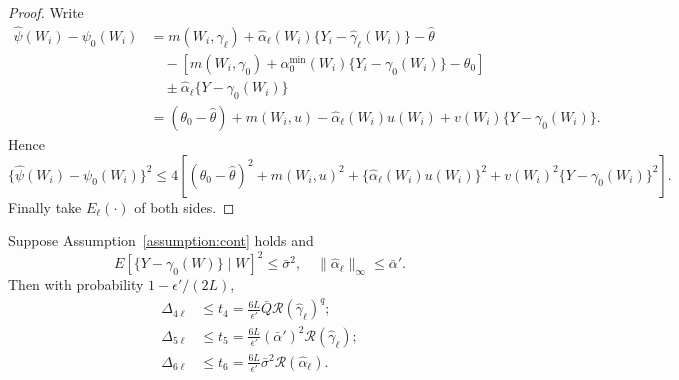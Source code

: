\begin{proof}
Write
\begin{align*}
    \hat{\psi}(W_i)-\psi_0(W_i)
    &=m(W_i,\hat{\gamma}_{\ell})+\hat{\alpha}_{\ell}(W_i)\{Y_i-\hat{\gamma}_{\ell}(W_i)\}-\hat{\theta}\\
    &\quad -\left[m(W_i,\gamma_0)+\alpha_0^{\min}(W_i)\{Y_i-\gamma_0(W_i)\}-\theta_0\right] \\
    &\quad\pm \hat{\alpha}_{\ell}\{Y-\gamma_0(W_i)\}\\
    &=(\theta_0-\hat{\theta})+m(W_i,u)-\hat{\alpha}_{\ell}(W_i)u(W_i)+v(W_i)\{Y-\gamma_0(W_i)\}.
\end{align*}
Hence
$$
\{\hat{\psi}(W_i)-\psi_0(W_i)\}^2\leq 4\left[ (\theta_0-\hat{\theta})^2+m(W_i,u)^2+\{\hat{\alpha}_{\ell}(W_i)u(W_i)\}^2+v(W_i)^2\{Y-\gamma_0(W_i)\}^2\right].
$$
Finally take $E_{\ell}(\cdot)$ of both sides.
\end{proof}

\begin{proposition}[Residuals]\label{prop:resid2}
Suppose Assumption~\ref{assumption:cont} holds and
$$
E[\{Y-\gamma_0(W)\} \mid W ]^2\leq \bar{\sigma}^2,\quad \|\hat{\alpha}_{\ell}\|_{\infty}\leq\bar{\alpha}'.
$$
Then with probability $1-\epsilon'/(2L)$,
\begin{align*}
    \Delta_{4\ell}&\leq t_4=\frac{6L}{\epsilon'}\bar{Q}\mathcal{R}(\hat{\gamma}_{\ell})^q; \\
     \Delta_{5\ell}&\leq t_5=\frac{6L}{\epsilon'}(\bar{\alpha}')^2\mathcal{R}(\hat{\gamma}_{\ell}); \\
     \Delta_{6\ell}&\leq t_6=\frac{6L}{\epsilon'}\bar{\sigma}^2\mathcal{R}(\hat{\alpha}_{\ell}). 
\end{align*}
\end{proposition}

